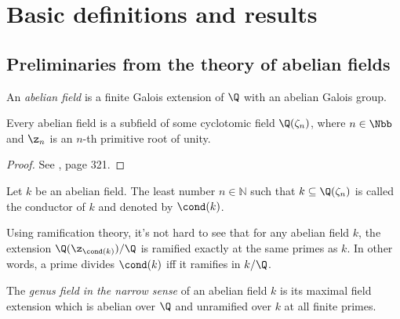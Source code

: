 \chapter{Basic definitions and results}
\setcounter{page}{1}

\section{Preliminaries from the theory of abelian fields}
\begin{definition}
An \textit{abelian field} is a finite Galois extension of $\Q$ with an abelian Galois group. 
\end{definition}

\begin{theorem}
Every abelian field is a subfield of some cyclotomic field $\Q(\zeta_n)$, where $n\in \Nbb$ and $\z_n$ is an $n$-th primitive root of unity.
\end{theorem}
\begin{proof}
See \citep{washington1997}, page 321.
\end{proof}

\begin{definition}
Let $k$ be an abelian field. The least number $n\in\mathbb{N}$ such that $k\subseteq \Q(\zeta_n)$ is called the conductor of $k$ and denoted by $\cond(k)$.
\end{definition}

\begin{rem}\label{ramif}
Using ramification theory, it's not hard to see that for any abelian field $k$, the extension $\Q(\z_{\cond(k)})/\Q$ is ramified exactly at the same primes as $k$. In other words, a prime divides $\cond(k)$ iff it ramifies in $k/\Q$.
\end{rem}

\begin{definition}\label{genusdef}
The \textit{genus field in the narrow sense} of an abelian field $k$ is its maximal field extension which is abelian over $\Q$ and unramified over $k$ at all finite primes.
\end{definition}

